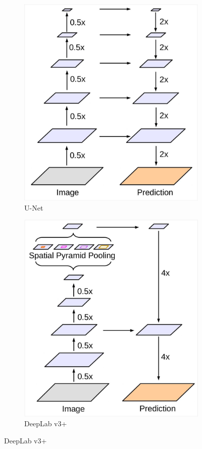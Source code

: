 \begin{description}
\begin{figure}[H]
\begin{subfigure}{0.3\linewidth}
                \includegraphics[width=0.9\linewidth]{./img/_deeplabv3plus_2.jpg}
                \caption{U-Net}
            \end{subfigure}
            \hfill
            \begin{subfigure}{0.3\linewidth}
                \centering
                \includegraphics[width=0.9\linewidth]{./img/_deeplabv3plus_3.jpg}
                \caption{DeepLab v3+}
            \end{subfigure}
        \end{figure}
\end{description}



